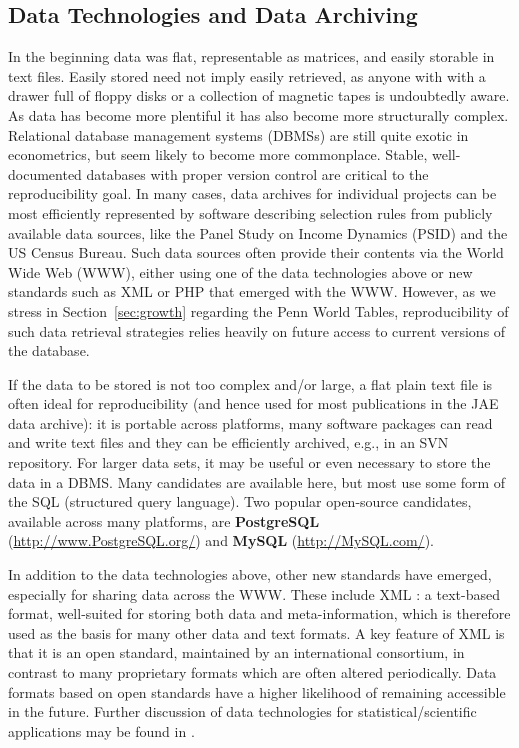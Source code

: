 \documentclass[10pt,a4paper,twoside]{article}
\let\pkg=\textbf
\let\proglang=\textsf
\begin{document}
\subsection{Data Technologies and Data Archiving} \label{sec:data}

In the beginning data was flat, representable as matrices, and easily storable in
text files.  Easily stored need not imply easily retrieved, as anyone with 
with a drawer full of floppy disks or a collection of magnetic tapes 
is undoubtedly aware. As data has become more plentiful it has also become
more structurally complex.
Relational database management systems (DBMSs) are still
quite exotic in econometrics, but seem likely to become more commonplace.
Stable, well-documented databases with proper version control are critical to
the reproducibility goal. 
In many cases, data archives for individual projects can be most efficiently
represented by software describing selection rules from publicly available
data sources, like the Panel Study on Income Dynamics (PSID) and the US
Census Bureau. Such data sources often provide their contents via the World
Wide Web (WWW), either using one of the data technologies above or new standards
such as \proglang{XML} or \proglang{PHP} that emerged with the WWW.
However, as we stress in Section~\ref{sec:growth} regarding the Penn World Tables,
reproducibility of such data retrieval strategies relies heavily on future access to
current versions of the database.

If the data to be stored is not too complex and/or large, a flat plain text file
is often ideal for reproducibility (and hence used for most publications in the
JAE data archive): it is portable across platforms, many software
packages can read and write text files and they can be efficiently archived, e.g.,
in an SVN repository.
For larger data sets, it may be useful or even necessary to store the data
in a DBMS. Many candidates are available here, but most use
some form of the \proglang{SQL} (structured query language).
Two popular open-source candidates, available across many platforms, are
\pkg{PostgreSQL} (\url{http://www.PostgreSQL.org/}) and \pkg{MySQL} (\url{http://MySQL.com/}).

In addition to the data technologies above, other new standards have emerged,
especially for sharing data across the WWW. These include 
\proglang{XML} \citep[extensible markup language,][]
{repro:Bray+Paoli+SperbergMcQueen:2008}: a text-based format,
well-suited for storing both data and meta-information, which is therefore used
as the basis for many other data and text formats. A key feature of \proglang{XML}
is that it is an open standard, maintained by an international consortium,
in contrast to many proprietary formats which are often altered periodically.
Data formats based on open standards have a higher likelihood of remaining accessible in the future. 
Further discussion of data technologies for statistical/scientific applications may
be found in \cite{repro:Murrell:2009}. 
\end{document}

